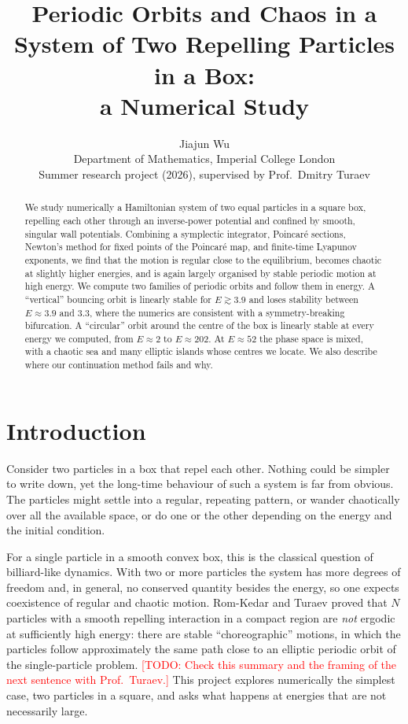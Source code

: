 \documentclass[11pt,a4paper]{article}
\title{Periodic Orbits and Chaos in a System of Two Repelling Particles in a Box:\\
a Numerical Study}
\author{Jiajun Wu\\[2pt]
\small Department of Mathematics, Imperial College London\\
\small Summer research project (2026), supervised by Prof.\ Dmitry Turaev}
\date{\todo{date}}
\newcommand{\todo}[1]{\textcolor{red}{[TODO: #1]}}
\begin{document}
\maketitle

\begin{abstract}
We study numerically a Hamiltonian system of two equal particles in a square
box, repelling each other through an inverse-power potential and confined by
smooth, singular wall potentials. Combining a symplectic integrator, Poincar\'e
sections, Newton's method for fixed points of the Poincar\'e map, and finite-time
Lyapunov exponents, we find that the motion is regular close to the equilibrium,
becomes chaotic at slightly higher energies, and is again largely organised by
stable periodic motion at high energy. We compute two families of periodic
orbits and follow them in energy. A ``vertical'' bouncing orbit is linearly
stable for $E\gtrsim3.9$ and loses stability between $E\approx3.9$ and $3.3$,
where the numerics are consistent with a symmetry-breaking bifurcation. A
``circular'' orbit around the centre of the box is linearly stable at every
energy we computed, from $E\approx2$ to $E\approx202$. At $E\approx52$ the phase
space is mixed, with a chaotic sea and many elliptic islands whose centres we
locate. We also describe where our continuation method fails and why.
\end{abstract}

\section{Introduction}\label{sec:intro}

Consider two particles in a box that repel each other. Nothing could be simpler
to write down, yet the long-time behaviour of such a system is far from obvious.
The particles might settle into a regular, repeating pattern, or wander
chaotically over all the available space, or do one or the other depending on
the energy and the initial condition.

For a single particle in a smooth convex box, this is the classical question of
billiard-like dynamics. With two or more particles the system has more degrees
of freedom and, in general, no conserved quantity besides the energy, so one
expects coexistence of regular and chaotic motion. Rom-Kedar and Turaev
\cite{turaev2022} proved that $N$ particles with a smooth repelling interaction
in a compact region are \emph{not} ergodic at sufficiently high energy: there
are stable ``choreographic'' motions, in which the particles follow
approximately the same path close to an elliptic periodic orbit of the
single-particle problem. \todo{Check this summary and the framing of the next
sentence with Prof.\ Turaev.} This project explores numerically the simplest
case, two particles in a square, and asks what happens at energies that are
not necessarily large.
\end{document}
